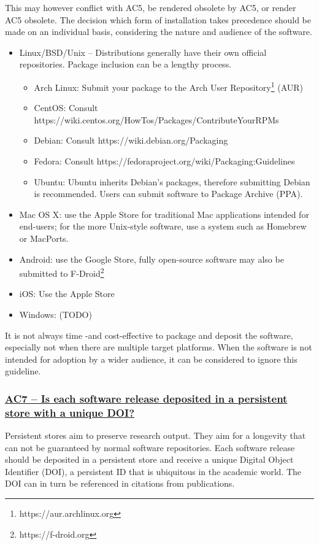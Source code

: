\documentclass[a4paper,11pt]{article}
\newcommand{\indicator}[1]{\subsubsection*{\underline{#1}}}
\begin{document}
This may however conflict with AC5, be rendered obsolete by AC5, or render AC5
obsolete. The decision which form of installation takes precedence should be
made on an individual basis, considering the nature and audience of the
software.

\begin{itemize}
    \item Linux/BSD/Unix -- Distributions generally have their own official repositories. Package inclusion can be a lengthy process.
    \begin{itemize}
        \item Arch Linux: Submit your package to the Arch User Repository\footnote{https://aur.archlinux.org} (AUR)
		\item CentOS: Consult https://wiki.centos.org/HowTos/Packages/ContributeYourRPMs
        \item Debian: Consult https://wiki.debian.org/Packaging
        \item Fedora: Consult https://fedoraproject.org/wiki/Packaging:Guidelines
        \item Ubuntu: Ubuntu inherits Debian's packages, therefore submitting Debian is recommended. Users can submit software  to Package Archive (PPA).
    \end{itemize}
    \item Mac OS X: use the Apple Store for traditional Mac applications intended for end-users; for the more Unix-style
        software, use a system such as Homebrew or MacPorts.
    \item Android: use the Google Store, fully open-source software may also be submitted to F-Droid\footnote{https://f-droid.org}
    \item iOS: Use the Apple Store
    \item Windows: (TODO) 
\end{itemize}

It is not always time -and cost-effective to package and deposit the software,
especially not when there are multiple target platforms. When the software is
not intended for adoption by a wider audience, it can be considered to ignore
this guideline.

\indicator{AC7 -- Is each software release deposited in a persistent store with a unique DOI?}

Persistent stores aim to preserve research output. They aim for a longevity
that can not be guaranteed by normal software repositories. Each software
release should be deposited in a persistent store and receive a unique Digital
Object Identifier (DOI),  a persistent ID that is ubiquitous in the academic
world. The DOI can in turn be referenced in citations from publications.
\end{document}

